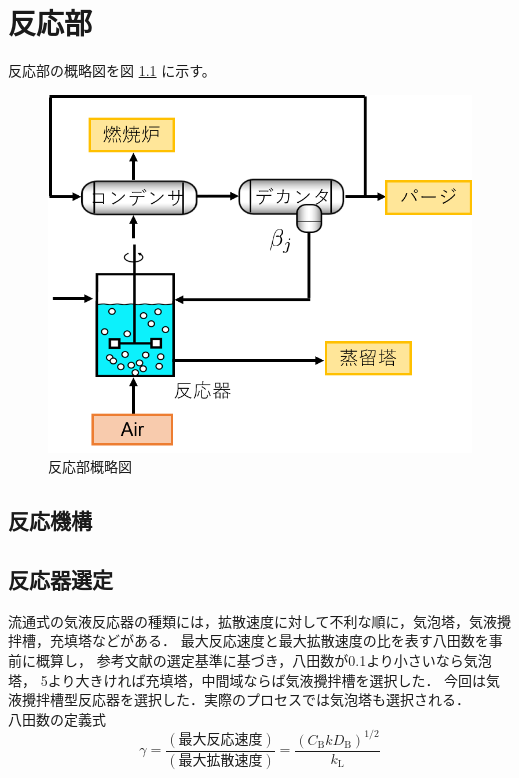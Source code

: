 \documentclass[a4j]{jsreport}
\begin{document}
\newpage
\chapter{反応部}

反応部の概略図を図 \ref{反応部設計結果の概略図} に示す。
\begin{figure}[h]
    \label{反応部設計結果の概略図}
    \begin{center}
        \includegraphics[scale=0.7]{ReactionSection.png}
        \caption{反応部概略図}
    \end{center}
\end{figure}

\section{反応機構}

\section{反応器選定}
流通式の気液反応器の種類には，拡散速度に対して不利な順に，気泡塔，気液攪拌槽，充填塔などがある．
最大反応速度と最大拡散速度の比を表す八田数を事前に概算し，
参考文献\cite{化工便覧}の選定基準に基づき，八田数が0.1より小さいなら気泡塔，
5より大きければ充填塔，中間域ならば気液攪拌槽を選択した．
今回は気液攪拌槽型反応器を選択した．実際のプロセスでは気泡塔も選択される．\\
八田数の定義式
\begin{equation}
    \gamma = \frac{(\text{最大反応速度})}{(\text{最大拡散速度})} = \frac{(C_{\mathrm{ B}}kD_{\mathrm{ B}})^{1/2}}{k_{\mathrm{ L}}}
\end{equation}
\end{document}
